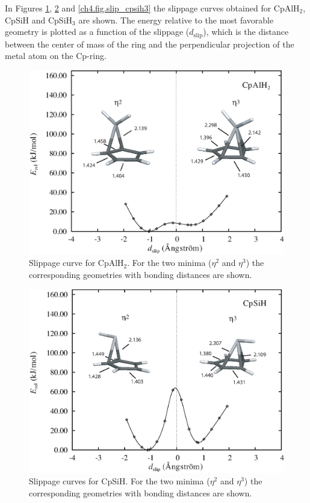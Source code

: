 In Figures \ref{ch4.fig.slip_cpalh2}, \ref{ch4.fig.slip_cpsih} and \ref{ch4.fig.slip_cpsih3} the slippage curves obtained for CpAlH$_2$, CpSiH and CpSiH$_3$ are shown. The energy relative to the most favorable geometry is plotted as a function of  the slippage ($d_\mathrm{slip}$), which is the distance between the center of mass of the ring and the  perpendicular projection of the metal atom on the Cp-ring.
\begin{figure}[hbtp]
\center
\includegraphics[scale=0.80]{cyclopentadienyl/figures/cpalh2.eps}
\caption{Slippage curve for CpAlH$_2$. For the two minima ($\eta^2$ and $\eta^3$) the corresponding geometries with bonding distances are shown.}
\label{ch4.fig.slip_cpalh2}
\end{figure}
\begin{figure}[htbp]
\center
\includegraphics[scale=0.80]{cyclopentadienyl/figures/cpsih.eps}
\caption{Slippage curves for CpSiH. For the two minima ($\eta^2$ and $\eta^3$) the corresponding geometries with bonding distances are shown.}
\label{ch4.fig.slip_cpsih}
\end{figure}
